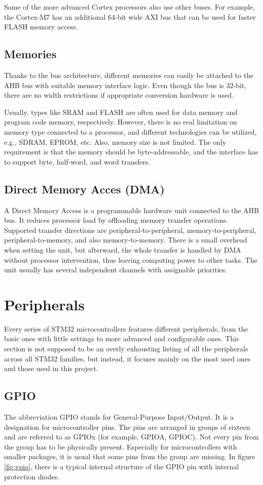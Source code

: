 Some of the more advanced Cortex processors also use other buses. For example, the Cortex-M7 has an additional 64-bit wide AXI bus that can be used for faster FLASH memory access. 

	\subsection{Memories}
	\label{sub:memories}
Thanks to the bus architecture, different memories can easily be attached to the AHB bus with suitable memory interface logic. Even though the bus is 32-bit, there are no width restrictions if appropriate conversion hardware is used.

Usually, types like SRAM and FLASH are often used for data memory and program code memory, respectively. However, there is no real limitation on memory type connected to a processor, and different technologies can be utilized, e.g., SDRAM, EPROM, etc. Also, memory size is not limited. The only requirement is that the memory should be byte-addressable, and the interface has to support byte, half-word, and word transfers.

	\subsection{Direct Memory Acces (DMA)}
	\label{sub:dma}
A Direct Memory Access is a programmable hardware unit connected to the AHB bus. It reduces processor load by offloading memory transfer operations. Supported transfer directions are peripheral-to-peripheral, memory-to-peripheral, peripheral-to-memory, and also memory-to-memory. There is a small overhead when setting the unit, but afterward, the whole transfer is handled by DMA without processor intervention, thus leaving computing power to other tasks. The unit usually has several independent channels with assignable priorities.


\section{Peripherals}
\label{sec:stm_periph}
Every series of STM32 microcontrollers features different peripherals, from the basic ones with little settings to more advanced and configurable ones. This section is not supposed to be an overly exhausting listing of all the peripherals across all STM32 families, but instead, it focuses mainly on the most used ones and those used in this project.

	\subsection{GPIO}
	\label{sub:gpio}
The abbreviation GPIO stands for General-Purpose Input/Output. It is a designation for microcontroller pins. The pins are arranged in groups of sixteen and are referred to as GPIOx (for example, GPIOA, GPIOC). Not every pin from the group has to be physically present. Especially for microcontrollers with smaller packages, it is usual that some pins from the group are missing. In figure \ref{fig:gpio}, there is a typical internal structure of the GPIO pin with internal protection diodes.

